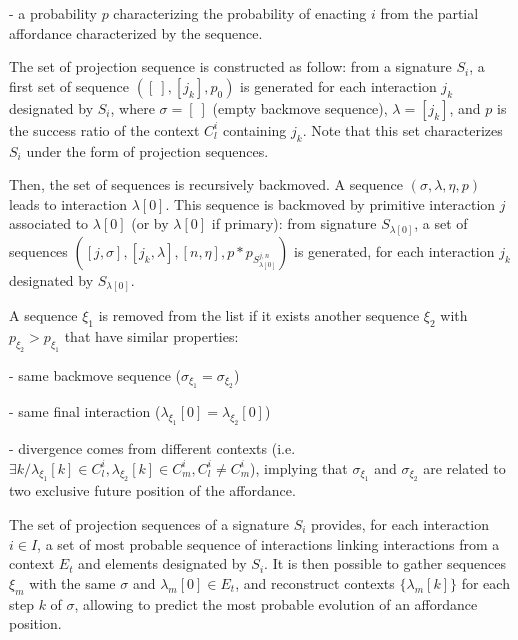\documentclass[conference]{IEEEtran}
\begin{document}

- a probability $p$ characterizing the probability of enacting $i$ from the partial affordance characterized by the sequence.


The set of projection sequence is constructed as follow: from a signature $S_i$, a first set of sequence $([\:], [j_k], p_0)$ is generated for each interaction $j_k$ designated by $S_i$, where $\sigma=[\: ]$ (empty backmove sequence), $\lambda=[j_k]$,%
and $p$ is the success ratio of the context $C_l^i$ containing $j_k$. Note that this set characterizes $S_i$ under the form of projection sequences.

Then, the set of sequences is recursively backmoved. A sequence $(\sigma, \lambda, \eta, p)$ leads to interaction $\lambda[0]$. This sequence is backmoved by primitive interaction $j$ associated to $\lambda[0]$ (or by $\lambda[0]$ if primary): from signature $S_{\lambda[0]}$, a set of sequences $([j,\sigma], [j_k,\lambda], [n,\eta], p*p_{S_{\lambda[0]}^{j,n}})$ is generated, for each interaction $j_k$ designated by $S_{\lambda[0]}$.

A sequence $\xi_1$ is removed from the list if it exists another sequence $\xi_2$ with $p_{\xi_2}>p_{\xi_1}$ that have similar properties:

- same backmove sequence ($\sigma_{\xi_1}=\sigma_{\xi_2}$)

- same final interaction ($\lambda_{\xi_1}[0]=\lambda_{\xi_2}[0]$)

- divergence comes from different contexts (i.e. $\exists k / \lambda_{\xi_1}[k] \in C_l^i, \lambda_{\xi_2}[k] \in C_m^i, C_l^i \neq C_m^i$), implying that $\sigma_{\xi_1}$ and $\sigma_{\xi_2}$  are related to two exclusive future position of the affordance. %

The set of projection sequences of a signature $S_i$ provides, for each interaction $i \in I$, a set of most probable sequence of interactions linking interactions from a context $E_t$ and elements designated by $S_i$.
It is then possible to gather sequences $\xi_m$ with the same $\sigma$ and $\lambda_m[0]\in E_t$, and reconstruct contexts $\{\lambda_m[k]\}$ for each step $k$ of $\sigma$, allowing to predict the most probable evolution of an affordance position.
\end{document}
